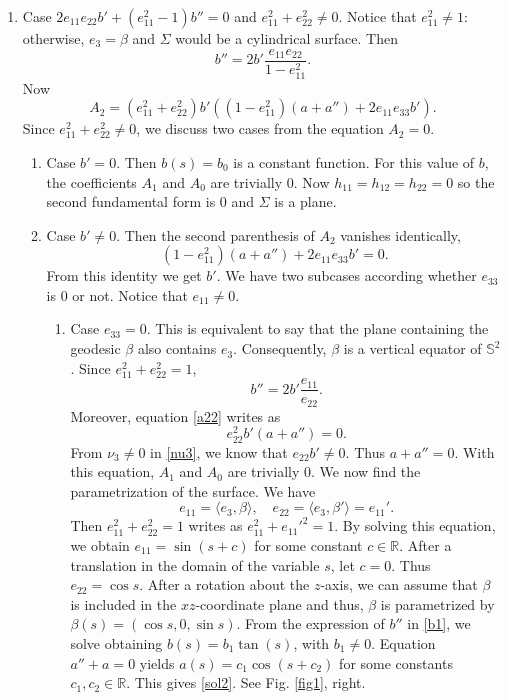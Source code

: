 \documentclass[12pt,a4paper,reqno]{amsart}
\def\r{\mathbb R}
\def\s{\mathbb S}
\begin{document}
\begin{enumerate}
\begin{enumerate}
\end{enumerate}
\item  Case $2e_{11}e_{22}b'+(e_{11}^2-1)b''=0$ and $e_{11}^2+e_{22}^2\not=0$. Notice that $e_{11}^2\not=1$: otherwise,  $e_3=\beta$ and $\Sigma$ would be a cylindrical surface. Then 
\begin{equation}\label{b2}
b''=2b'\frac{e_{11}e_{22}}{1-e_{11}^2}.
\end{equation}
Now 
$$A_2=(e_{11}^2+e_{22}^2)b'\left( (1-e_{11}^2)(a+a'')+2e_{11}e_{33}b'  \right).$$
Since $e_{11}^2+e_{22}^2\not=0$, we discuss two cases from the equation $A_2=0$. 
\begin{enumerate}
\item Case $b'=0$. Then $b(s)=b_0$ is a constant function. For this value of $b$,  the  coefficients $A_1$ and $A_0$ are trivially $0$. Now $h_{11}=h_{12}=h_{22}=0$ so the second fundamental form is $0$ and  $\Sigma$ is a plane.  
\item Case $b'\not=0$. Then the second parenthesis of $A_2$ vanishes identically,  
\begin{equation}\label{a22}(1-e_{11}^2)(a+a'')+2e_{11}e_{33}b'=0.
\end{equation}
From this identity we get $b'$. We have two subcases according whether $e_{33}$ is $0$ or not. Notice that $e_{11}\not=0$. 
\begin{enumerate}
\item Case $e_{33}=0$. This is equivalent to say that the plane containing the geodesic $\beta$ also contains $e_3$. Consequently, $\beta$ is a vertical equator of $\s^2$.
Since $e_{11}^2+e_{22}^2=1$, 
\begin{equation}\label{b1}
b''=2b'\frac{e_{11}}{e_{22}}.
\end{equation}
Moreover, equation \eqref{a22} writes as 
$$ e_{22}^2 b'(a+a'')=0.$$
From $\nu_3\not=0$ in \eqref{nu3}, we know that $e_{22}b'\not=0$. Thus   $a+a''=0$. With this equation,  $A_1$ and $A_0$  are trivially $0$. We now find the parametrization of the surface. We have
$$e_{11}=\langle e_3,\beta\rangle,\quad e_{22}=\langle e_3,\beta'\rangle=e_{11}'.$$
Then $e_{11}^2+e_{22}^2=1$ writes as $e_{11}^2+e_{11}'^2=1$. By solving this equation, we obtain   $e_{11}=\sin(s+c)$ for some constant $c\in\r$. After a translation in the domain of the variable $s$, let $c=0$.  Thus $e_{22}=\cos s$. After a rotation about the $z$-axis, we can assume that $\beta$ is included in the $xz$-coordinate plane and thus, $\beta$ is parametrized by  
 $\beta(s)=(\cos s,0,\sin s)$. From the expression of $b''$ in \eqref{b1}, we solve obtaining $b(s)=b_1\tan(s) $, with $b_1\not=0$. Equation $a''+a=0$ yields $a(s)=c_1\cos(s+c_2)$ for some constants $c_1,c_2\in\r$.  This gives \eqref{sol2}. See Fig. \ref{fig1}, right. 


\end{enumerate}
\end{enumerate}
\end{enumerate}
\end{document}
